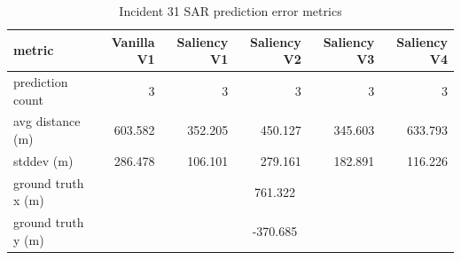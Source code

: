 \begin{table}[ht]
\centering
\caption{Incident 31 SAR prediction error metrics}
\label{tab:sar-incident-31}
\begin{tabular}{lrrrrr}
\hline
metric & Vanilla V1 & Saliency V1 & Saliency V2 & Saliency V3 & Saliency V4 \\
\hline
prediction count & 3 & 3 & 3 & 3 & 3 \\
avg distance (m) & 603.582 & 352.205 & 450.127 & 345.603 & 633.793 \\
stddev (m) & 286.478 & 106.101 & 279.161 & 182.891 & 116.226 \\
ground truth x (m) & \multicolumn{5}{c}{761.322} \\
ground truth y (m) & \multicolumn{5}{c}{-370.685} \\
\hline
\end{tabular}
\end{table}
